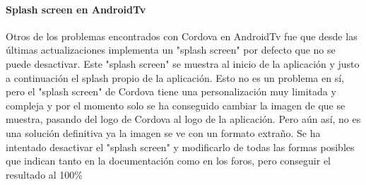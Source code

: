 \paragraph{Splash screen en AndroidTv}
Otros de los problemas encontrados con Cordova en AndroidTv fue que desde las últimas actualizaciones implementa 
un "splash screen" por defecto que no se puede desactivar. Este "splash screen" se muestra al inicio de la aplicación
y justo a continuación el splash propio de la aplicación. Esto no es un problema en sí, pero el "splash screen" de
Cordova tiene una personalización muy limitada y compleja y por el momento solo se ha conseguido cambiar la imagen
de que se muestra, pasando del logo de Cordova al logo de la aplicación. Pero aún así, no es una solución definitiva
ya la imagen se ve con un formato extraño. Se ha intentado desactivar el "splash screen" y modificarlo de todas 
las formas posibles que indican tanto en la documentación como en los foros, pero conseguir el resultado al 100\%

